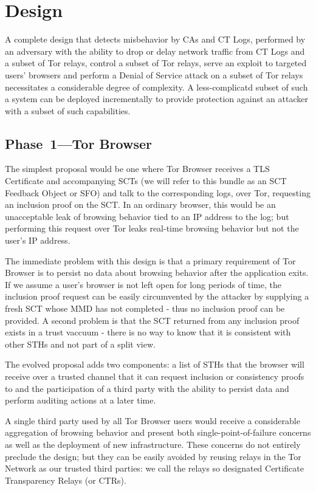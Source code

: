\section{Design} \label{sec:base}

A complete design that detects misbehavior by CAs and CT Logs, performed by an adversary with the ability to drop or delay network traffic from CT Logs and a subset of Tor relays, control a subset of Tor relays, serve an exploit to targeted users' browsers and perform a Denial of Service attack on a subset of Tor relays necessitates a considerable degree of complexity. A less-complicatd subset of such a system can be deployed incrementally to provide protection against an attacker with a subset of such capabilities.

\subsection{Phase~1---Tor Browser} \label{sec:base:phase1}

The simplest proposal would be one where Tor Browser receives a TLS Certificate and accompanying SCTs (we will refer to this bundle as an SCT Feedback Object or SFO) and talk to the corresponding logs, over Tor, requesting an inclusion proof on the SCT. In an ordinary browser, this would be an unacceptable leak of browsing behavior tied to an IP address to the log; but performing this request over Tor leaks real-time browsing behavior but not the user's IP address.

The immediate problem with this design is that a primary requirement of Tor Browser is to persist no data about browsing behavior after the application exits. If we assume a user's browser is not left open for long periods of time, the inclusion proof request can be easily circumvented by the attacker by supplying a fresh SCT whose MMD has not completed - thus no inclusion proof can be provided. A second problem is that the SCT returned from any inclusion proof exists in a trust vaccuum - there is no way to know that it is consistent with other STHs and not part of a split view.

The evolved proposal adds two components: a list of STHs that the browser will receive over a trusted channel that it can request inclusion or consistency proofs to and the participation of a third party with the ability to persist data and perform auditing actions at a later time.

A single third party used by all Tor Browser users would receive a considerable aggregation of browsing behavior and present both  single-point-of-failure concerns as well as the deployment of new infrastructure. These concerns do not entirely preclude the design; but they can be easily avoided by reusing relays in the Tor Network as our trusted third parties: we call the relays so designated Certificate Transparency Relays (or CTRs).

